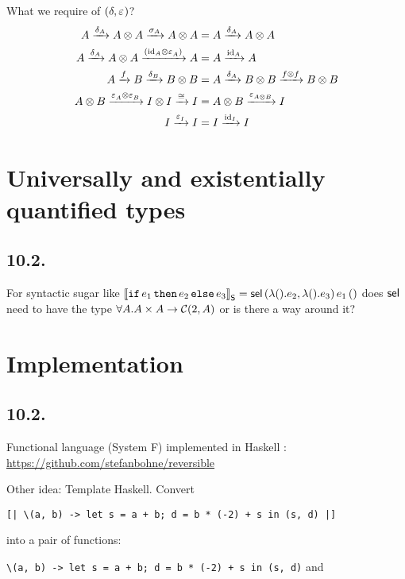 \documentclass[runningheads,envcountsame]{llncs}
\begin{document}
What we require of $(\dup, \terminal)$?
\begin{align}
    A \xrightarrow{\dup_A} \tensor{A}{A} \xrightarrow{\swap_A} \tensor{A}{A} &= A \xrightarrow{\dup_A} \tensor{A}{A} \\
    A \xrightarrow{\dup_A} \tensor{A}{A} \xrightarrow{(\tensor{\id_A}{\terminal_A})} A &= A \xrightarrow{\id_A} A \\
    A \xrightarrow{f} B \xrightarrow{\dup_B} \tensor{B}{B} &= A \xrightarrow{\dup_A} \tensor{B}{B} \xrightarrow{\tensor{f}{f}} \tensor{B}{B} \\
    \tensor{A}{B} \xrightarrow{\tensor{\terminal_A}{\terminal_B}} \tensor{I}{I} \xrightarrow{\cong} I &= \tensor{A}{B} \xrightarrow{\terminal_{\tensor{A}{B}}} I \\
    I \xrightarrow{\terminal_I} I &= I \xrightarrow{\id_I} I
\end{align}

\section{Universally and existentially quantified types}
\subsection{10.2.}

For syntactic sugar like $\sugar{\eifthenelse{e_1}{e_2}{e_3}} = \eapp{\eapp{\eapp{\select}{\epair{\elam{\eunit}{e_2}}{\elam{\eunit}{e_3}}}}{e_1}}{\eunit}$ does $\select$ need to have the type $\forall A. A \times A \to \mathcal{C}(2, A)$ or is there a way around it?

\section{Implementation}

\subsection{10.2.}

Functional language (System F) implemented in Haskell : \url{https://github.com/stefanbohne/reversible}

Other idea: Template Haskell. Convert 

\texttt{[| \textbackslash(a, b) -> let s = a + b; d = b * (-2) + s in (s, d) |]} 

into a pair of functions:

\texttt{\textbackslash(a, b) -> let s = a + b; d = b * (-2) + s in (s, d)} and
\end{document}
